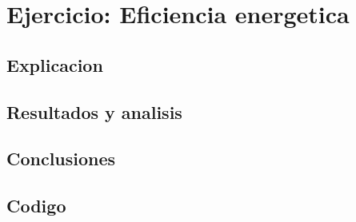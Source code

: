 \section{Ejercicio: Eficiencia energetica}
\subsection{Explicacion}
\subsection{Resultados y analisis}
\subsection{Conclusiones}
\subsection{Codigo}